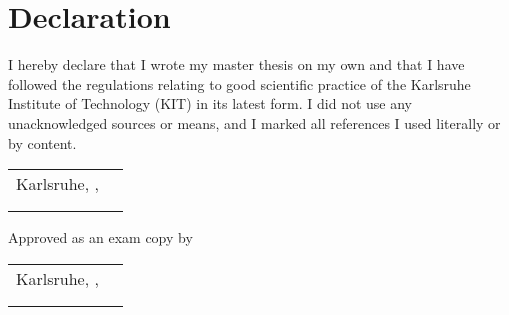 \chapter*{Declaration}
I hereby declare that I wrote my master thesis on my own and that I have followed the regulations relating to good scientific practice of the Karlsruhe Institute of Technology (KIT) in its latest form. I did not use any unacknowledged sources or means, and I marked all references I used literally or by content.\\

\vspace{1cm}

\renewcommand{\arraystretch}{0} %

\begin{flushright}
	\begin{tabular}{rr}
		Karlsruhe, \thesistimehandin, & \hspace*{5cm}\\[0mm]
		\cline{2-2}\\[2mm]    %
		& \thesisauthor       %
	\end{tabular}
\end{flushright}

\vfill

\begin{flushright}
	Approved as an exam copy by \\
	\vspace{1cm}
	\begin{tabular}{rr}
		Karlsruhe, \thesistimehandin, & \hspace*{5cm}\\[0mm]
		\cline{2-2}\\[2mm]    %
		& \thesisreviewerone  %
	\end{tabular}
\end{flushright}

\renewcommand{\arraystretch}{1}

\cleardoublepage

